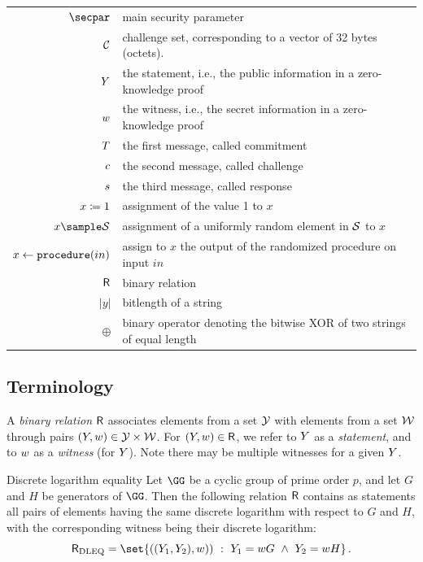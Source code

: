 \documentclass[11pt]{article}
\begin{document}
\begin{tabular}{r@{\hspace{1em}}p{11cm}}
    $\secpar$ & main security parameter\\
    $\mathcal{C}$ & challenge set, corresponding to a vector of 32 bytes (octets).\\
    $Y$ & the statement, i.e., the public information in a zero-knowledge proof \\
    $w$ & the witness, i.e., the secret information in a zero-knowledge proof \\
    $T$ & the first message, called commitment \\
    $c$ & the second message, called challenge \\
    $s$ & the third message, called response \\
    $x \coloneqq 1$ & assignment of the value 1 to $x$\\
    $x\sample\someset$ & assignment of a uniformly random element in $\mathcal{S}$ to $x$\\
    $x\gets\texttt{procedure}(in)$ & assign to $x$ the output of the randomized procedure on input $in$\\
    $\mathsf{R}$ & binary relation\\
    $|y|$ & bitlength of a string \\
    $\oplus$ & binary operator denoting the bitwise XOR of two strings of equal length
\end{tabular}

\subsection{Terminology}
A \emph{binary relation} $\mathsf{R}$ associates elements from a set $\mathcal{Y}$ with elements from a set $\mathcal{W}$ through pairs $(Y,w)\in\mathcal{Y}\times\mathcal{W}$.
For $(Y,w)\in\mathsf{R}$, we refer to $Y$ as a \emph{statement}, and to $w$ as a \emph{witness} (for $Y$).
Note there may be multiple witnesses for a given $Y$.

\begin{example}{Discrete logarithm equality}{}
  Let $\GG$ be a cyclic group of prime order $p$, and let $G$ and $H$ be generators of $\GG$.
	Then the following relation $\mathsf{R}$ contains as statements all pairs of elements having the same discrete logarithm with respect to $G$ and $H$, with the corresponding witness being their discrete logarithm:
  $$
	  \relation_{\operatorname{DLEQ}} = \set{\left((\statement_1,\statement_2),\witness)\right)~:~\statement_1=\witness G ~\land~ \statement_2=\witness H}\,.
	$$
\end{example}
\end{document}
